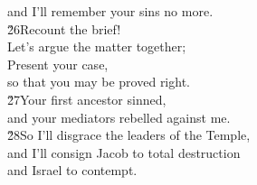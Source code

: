 \begin{poetry}
\poemlll       and I'll remember your sins no more. \\
\poeml \v{26}Recount the brief! \\
\poemll    Let's argue the matter together; \\
\poeml Present your case, \\
\poemll    so that you may be proved right. \\
\poeml \v{27}Your first ancestor sinned, \\
\poemll    and your mediators rebelled against me. \\
\poeml \v{28}So I'll disgrace the leaders of the Temple, \\
\poemll    and I'll consign Jacob to total destruction \\
\poemlll       and Israel to contempt.
\end{poetry}

